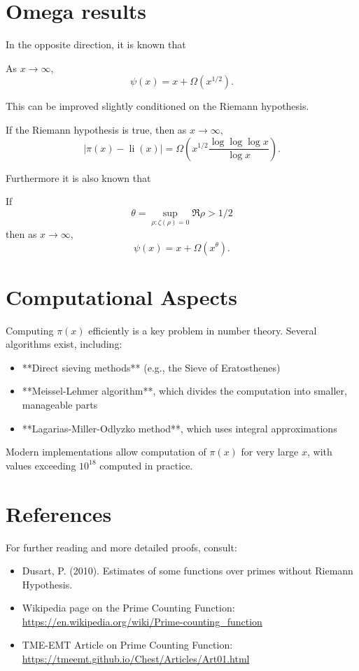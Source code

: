 \section{Omega results}

In the opposite direction, it is known that 
\begin{theorem}
As $x \to \infty$,
\[
\psi(x) = x + \Omega(x^{1/2}).
\]
\end{theorem}
This can be improved slightly conditioned on the Riemann hypothesis.
\begin{theorem}
If the Riemann hypothesis is true, then as $x \to \infty$,
\[
|\pi(x) - \operatorname{li}(x)| = \Omega\left(x^{1/2}\frac{\log\log\log x}{\log x}\right).
\]
\end{theorem}

Furthermore it is also known that
\begin{theorem}
If 
\[
\theta = \sup_{\rho: \zeta(\rho) = 0}\Re \rho > 1/2
\]
then as $x \to \infty$,
\[
\psi(x) = x + \Omega(x^{\theta}).
\]
\end{theorem}

\section{Computational Aspects}
Computing $\pi(x)$ efficiently is a key problem in number theory. Several algorithms exist, including:
\begin{itemize}
    \item **Direct sieving methods** (e.g., the Sieve of Eratosthenes)
    \item **Meissel-Lehmer algorithm**, which divides the computation into smaller, manageable parts
    \item **Lagarias-Miller-Odlyzko method**, which uses integral approximations
\end{itemize}
Modern implementations allow computation of $\pi(x)$ for very large $x$, with values exceeding $10^{18}$ computed in practice.

\section{References}
For further reading and more detailed proofs, consult:
\begin{itemize}
    \item Dusart, P. (2010). Estimates of some functions over primes without Riemann Hypothesis.
    \item Wikipedia page on the Prime Counting Function: \url{https://en.wikipedia.org/wiki/Prime-counting_function}
    \item TME-EMT Article on Prime Counting Function: \url{https://tmeemt.github.io/Chest/Articles/Art01.html}
\end{itemize}
